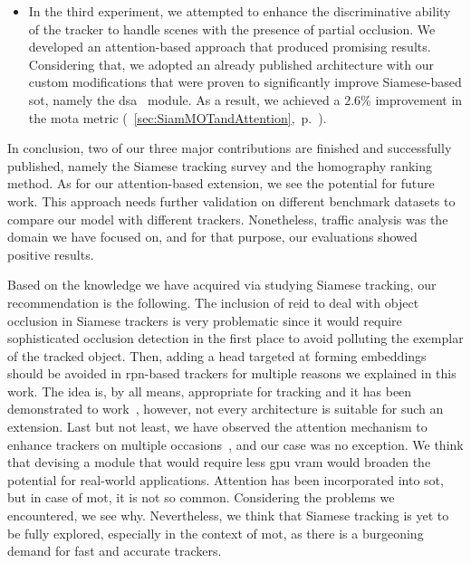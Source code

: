 \begin{enumerate}
\begin{itemize}
              \item In the third experiment, we attempted to enhance the discriminative ability of the tracker to handle scenes with the presence of partial occlusion. We developed an attention-based approach that produced promising results. Considering that, we adopted an already published architecture with our custom modifications that were proven to significantly improve Siamese-based \gls{sot}, namely the \gls{dsa}~\cite{yu2021dsa} module. As a result, we achieved a $2.6$\% improvement in the \gls{mota} metric (\sectiontext{}~\ref{sec:SiamMOTandAttention},~p.~\pageref{sec:SiamMOTandAttention}).
          \end{itemize}
\end{enumerate}

In conclusion, two of our three major contributions are finished and successfully published, namely the Siamese tracking survey and the homography ranking method. As for our attention-based extension, we see the potential for future work. This approach needs further validation on different benchmark datasets to compare our model with different trackers. Nonetheless, traffic analysis was the domain we have focused on, and for that purpose, our evaluations showed positive results.

Based on the knowledge we have acquired via studying Siamese tracking, our recommendation is the following. The inclusion of \gls{reid} to deal with object occlusion in Siamese trackers is very problematic since it would require sophisticated occlusion detection in the first place to avoid polluting the exemplar of the tracked object. Then, adding a head targeted at forming embeddings should be avoided in \gls{rpn}-based trackers for multiple reasons we explained in this work. The idea is, by all means, appropriate for tracking and it has been demonstrated to work~\cite{lu2020retinatrack, zhang2021fairmot}, however, not every architecture is suitable for such an extension. Last but not least, we have observed the attention mechanism to enhance trackers on multiple occasions~\cite{he2018twofoldsiam, wang2018learningattentions, yu2021dsa, li2018spatialawaresiam}, and our case was no exception. We think that devising a module that would require less \gls{gpu} \gls{vram} would broaden the potential for real-world applications. Attention has been incorporated into \gls{sot}, but in case of \gls{mot}, it is not so common. Considering the problems we encountered, we see why. Nevertheless, we think that Siamese tracking is yet to be fully explored, especially in the context of \gls{mot}, as there is a burgeoning demand for fast and accurate trackers.
